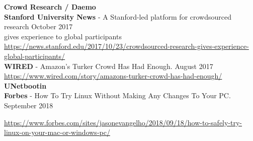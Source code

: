 





\textcolor{sectcol}{\textbf{Crowd Research / Daemo}}\\

\textbf{Stanford University News} - A Stanford-led platform for crowdsourced research \hfill October 2017\\
gives experience to global participants\\
\url{https://news.stanford.edu/2017/10/23/crowdsourced-research-gives-experience-global-participants/}\\

\textbf{WIRED} - Amazon's Turker Crowd Has Had Enough. \hfill August 2017\\
\url{https://www.wired.com/story/amazons-turker-crowd-has-had-enough/}\\

\textcolor{sectcol}{\textbf{UNetbootin}}\\

\textbf{Forbes} - How To Try Linux Without Making Any Changes To Your PC. \hfill September 2018\\
\begin{small}
\url{https://www.forbes.com/sites/jasonevangelho/2018/09/18/how-to-safely-try-linux-on-your-mac-or-windows-pc/}
\end{small}\\

